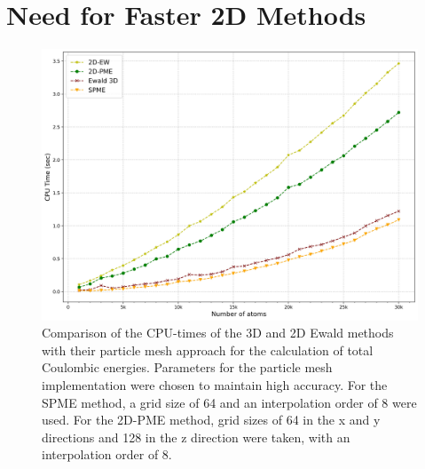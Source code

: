 \section{Need for Faster 2D Methods}
\begin{figure}[H]
    \centering
    \includegraphics[width=1\linewidth]{images/kAWATA_VS_SPME_Result30k_3DEwald.jpg}
    \caption{Comparison of the CPU-times of the 3D and 2D Ewald methods with their particle mesh approach for the calculation of total Coulombic energies. Parameters for the particle mesh implementation were chosen to maintain high accuracy. For the \ac{SPME} method, a grid size of 64 and an interpolation order of 8 were used. For the 2D-PME method, grid sizes of 64 in the x and y directions and 128 in the z direction were taken, with an interpolation order of 8.}
    \label{fig:enter-label}
\end{figure}